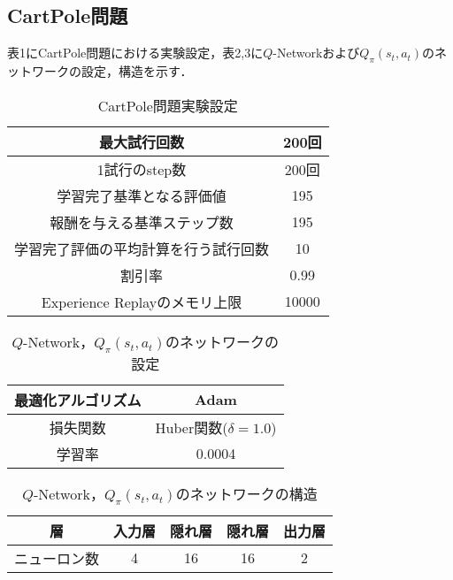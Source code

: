 \documentclass[twocolumn]{jarticle}
\begin{document}
        \subsection{CartPole問題}
        表1にCartPole問題における実験設定，表2,3に$Q$-Networkおよび$Q_\pi(s_t,a_t)$のネットワークの設定，構造を示す．
        \begin{table}
            \caption{CartPole問題実験設定}
            \begin{tabular}{|c|c|} \hline
                最大試行回数 & 200回 \\ \hline
                1試行のstep数 & 200回 \\ \hline
                学習完了基準となる評価値 & 195 \\ \hline
                報酬を与える基準ステップ数 & 195 \\ \hline
                学習完了評価の平均計算を行う試行回数 & 10 \\ \hline
                割引率 & 0.99 \\ \hline
                Experience Replayのメモリ上限 & 10000 \\ \hline
            \end{tabular}
        \end{table}
        \begin{table}
            \centering
            \caption{$Q$-Network，$Q_\pi(s_t,a_t)$のネットワークの設定}
            \begin{tabular}{|c|c|} \hline
                最適化アルゴリズム & Adam \\ \hline
                損失関数 & Huber関数($\delta=1.0$)\\ \hline %
                学習率 & 0.0004 \\ \hline
            \end{tabular}
        \end{table}
        \begin{table}
            \caption{$Q$-Network，$Q_\pi(s_t,a_t)$のネットワークの構造}
            \begin{tabular}{|c|c|c|c|c|} \hline
                層 & 入力層 & 隠れ層 & 隠れ層 & 出力層 \\ \hline
                ニューロン数 & 4 & 16 & 16 & 2 \\ \hline
            \end{tabular}
        \end{table}
        
\end{document}
